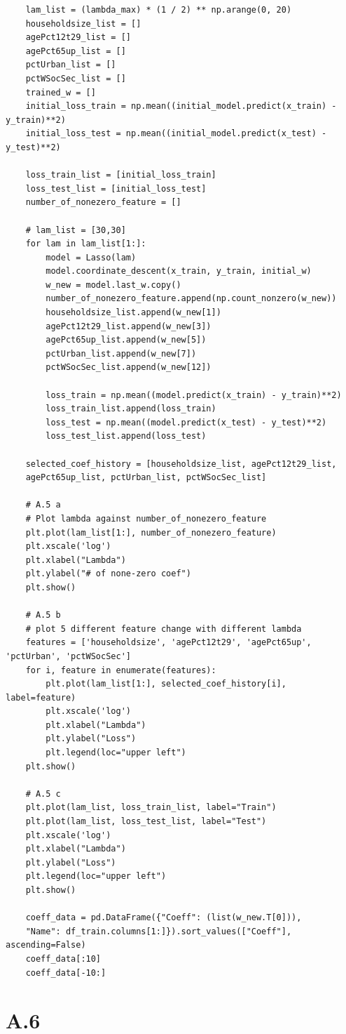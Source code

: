 \documentclass{article}
\begin{document}
\begin{verbatim}
	lam_list = (lambda_max) * (1 / 2) ** np.arange(0, 20)
	householdsize_list = []
	agePct12t29_list = []
	agePct65up_list = []
	pctUrban_list = []
	pctWSocSec_list = []
	trained_w = []
	initial_loss_train = np.mean((initial_model.predict(x_train) - y_train)**2)
	initial_loss_test = np.mean((initial_model.predict(x_test) - y_test)**2)
	
	loss_train_list = [initial_loss_train]
	loss_test_list = [initial_loss_test]
	number_of_nonezero_feature = []
	
	# lam_list = [30,30]
	for lam in lam_list[1:]:
		model = Lasso(lam)
		model.coordinate_descent(x_train, y_train, initial_w)
		w_new = model.last_w.copy()
		number_of_nonezero_feature.append(np.count_nonzero(w_new))
		householdsize_list.append(w_new[1])
		agePct12t29_list.append(w_new[3])
		agePct65up_list.append(w_new[5])
		pctUrban_list.append(w_new[7])
		pctWSocSec_list.append(w_new[12])
		
		loss_train = np.mean((model.predict(x_train) - y_train)**2)
		loss_train_list.append(loss_train)
		loss_test = np.mean((model.predict(x_test) - y_test)**2)
		loss_test_list.append(loss_test)
	
	selected_coef_history = [householdsize_list, agePct12t29_list, 
	agePct65up_list, pctUrban_list, pctWSocSec_list]
	
	# A.5 a
	# Plot lambda against number_of_nonezero_feature
	plt.plot(lam_list[1:], number_of_nonezero_feature)
	plt.xscale('log')
	plt.xlabel("Lambda")
	plt.ylabel("# of none-zero coef")
	plt.show()
	
	# A.5 b
	# plot 5 different feature change with different lambda
	features = ['householdsize', 'agePct12t29', 'agePct65up', 'pctUrban', 'pctWSocSec']
	for i, feature in enumerate(features):
		plt.plot(lam_list[1:], selected_coef_history[i], label=feature)
		plt.xscale('log')
		plt.xlabel("Lambda")
		plt.ylabel("Loss")
		plt.legend(loc="upper left")
	plt.show()
	
	# A.5 c
	plt.plot(lam_list, loss_train_list, label="Train")
	plt.plot(lam_list, loss_test_list, label="Test")
	plt.xscale('log')
	plt.xlabel("Lambda")
	plt.ylabel("Loss")
	plt.legend(loc="upper left")
	plt.show()
	
	coeff_data = pd.DataFrame({"Coeff": (list(w_new.T[0])),
	"Name": df_train.columns[1:]}).sort_values(["Coeff"], ascending=False)
	coeff_data[:10]
	coeff_data[-10:]

\end{verbatim}

\section*{A.6}
\end{document}
